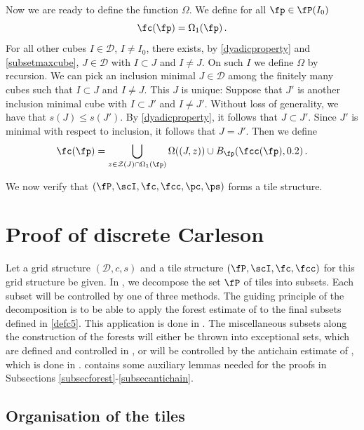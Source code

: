 Now we are ready to define the function $\Omega$. We define for all $\fp \in \fP(I_0)$
\begin{equation}
    \label{eq-max-omega}
    \fc(\fp) = \Omega_1(\fp)\,.
\end{equation}
For all other cubes $I \in \mathcal{D}$, $I \ne I_0$, there exists, by \eqref{dyadicproperty} and \eqref{subsetmaxcube}, $J \in \mathcal{D}$ with $I \subset J$ and $I \ne J$. On such $I$ we define $\Omega$ by recursion. We can pick an inclusion minimal $J \in \mathcal{D}$ among the finitely many cubes such that $I \subset J$ and $I \ne J$. This $J$ is unique: Suppose that $J'$ is another inclusion minimal cube with $I \subset J'$ and $I \ne J'$. Without loss of generality, we have that $s(J) \le s(J')$. By \eqref{dyadicproperty}, it follows that $J \subset J'$. Since $J'$ is minimal with respect to inclusion, it follows that $J = J'$. Then we define
\begin{equation}
    \label{eq-it-omega}
    \fc(\fp) = \bigcup_{z \in \mathcal{Z}(J) \cap \Omega_1(\fp)} \Omega((J, z)) \cup B_{\fp}(\fcc(\fp),0.2)\,.
\end{equation}

We now verify that $(\fP,\scI,\fc,\fcc,\pc,\ps)$ forms a tile structure.


\section{Proof of discrete Carleson}
\label{proptopropprop}



Let a grid structure $(\mathcal{D}, c, s)$ and a tile structure $(\fP, \scI, \fc, \fcc)$ for this grid structure be given. In , we decompose the set $\fP$ of tiles into subsets. Each subset will be controlled by one of three methods. The guiding principle of the decomposition is to be able to apply the forest estimate of  to the final subsets defined in \eqref{defc5}. This application is done in . The miscellaneous subsets along the construction of the forests will either be thrown into exceptional sets, which are defined and controlled in , or will be controlled by the antichain estimate of , which is done in .  contains some auxiliary lemmas needed for the proofs in Subsections \ref{subsecforest}-\ref{subsecantichain}.

\subsection{Organisation of the tiles}\label{subsectilesorg}


